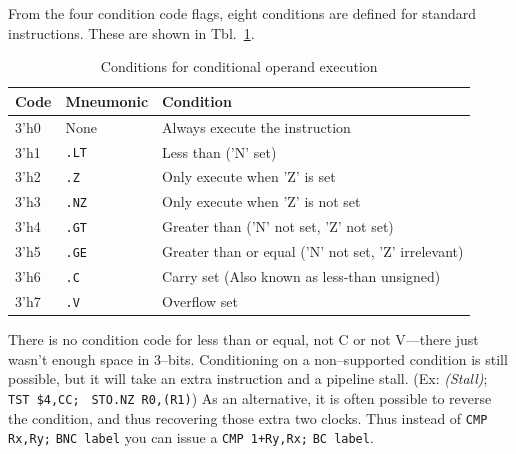 \documentclass{gqtekspec}
\begin{document}
From the four condition code flags, eight conditions are defined for standard
instructions.  These are shown in Tbl.~\ref{tbl:conditions}.
\begin{table}\begin{center}
\begin{tabular}{l|l|l}
Code & Mneumonic & Condition \\\hline
3'h0 & None & Always execute the instruction \\
3'h1 & {\tt .LT} & Less than ('N' set) \\
3'h2 & {\tt .Z} & Only execute when 'Z' is set \\
3'h3 & {\tt .NZ} & Only execute when 'Z' is not set \\
3'h4 & {\tt .GT} & Greater than ('N' not set, 'Z' not set) \\
3'h5 & {\tt .GE} & Greater than or equal ('N' not set, 'Z' irrelevant) \\
3'h6 & {\tt .C} & Carry set (Also known as less-than unsigned) \\
3'h7 & {\tt .V} & Overflow set\\
\end{tabular}
\caption{Conditions for conditional operand execution}\label{tbl:conditions}
\end{center}\end{table}
There is no condition code for less than or equal, not C or not V---there
just wasn't enough space in 3--bits.  Conditioning on a non--supported
condition is still possible, but it will take an extra instruction and a
pipeline stall.  (Ex: \hbox{\em (Stall)}; \hbox{\tt TST \$4,CC;} \hbox{\tt
STO.NZ R0,(R1)}) As an alternative, it is often possible to reverse the
condition, and thus recovering those extra two clocks.  Thus instead of
\hbox{\tt CMP Rx,Ry;} \hbox{\tt BNC label} you can issue a
\hbox{\tt CMP 1+Ry,Rx;} \hbox{\tt BC label}.
\end{document}
